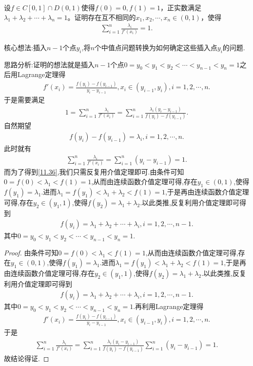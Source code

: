 \documentclass[../../main.tex]{subfiles}%
\begin{document}
\begin{example}
设\(f\in C[0,1]\cap D(0,1)\)使得\(f(0)=0,f(1)=1\)，正实数满足\(\lambda_1 + \lambda_2 + \cdots + \lambda_n = 1\)。证明存在互不相同的\(x_1,x_2,\cdots,x_n\in(0,1)\)，使得
\begin{align*}
\sum_{i = 1}^{n}\frac{\lambda_i}{f'(x_i)} = 1.
\end{align*} 
\end{example}
\begin{note}
核心想法:插入$n-1$个点$y_i$,将$n$个中值点问题转换为如何确定这些插入点$y_i$的问题.
\end{note}
\begin{remark}
思路分析:证明的想法就是插入\(n - 1\)个点\(0 = y_0 < y_1 < y_2 < \cdots < y_{n - 1} < y_n = 1\)之后用Lagrange定理得
\begin{align*}
f'(x_i)=\frac{f(y_i)-f(y_{i - 1})}{y_i - y_{i - 1}},x_i\in(y_{i - 1},y_i),i = 1,2,\cdots,n.
\end{align*}
于是需要满足
\begin{align*}
1=\sum_{i = 1}^{n}\frac{\lambda_i}{f'(x_i)}=\sum_{i = 1}^{n}\frac{\lambda_i(y_i - y_{i - 1})}{f(y_i)-f(y_{i - 1})}.
\end{align*}
自然期望
\begin{align}
f(y_i)-f(y_{i - 1})=\lambda_i,i = 1,2,\cdots,n.\label{11.36}
\end{align}
此时就有
\begin{align*}
\sum_{i = 1}^{n}\frac{\lambda_i}{f'(x_i)}=\sum_{i = 1}^{n}(y_i - y_{i - 1}) = 1.
\end{align*}
而为了得到\eqref{11.36},我们只需反复用介值定理即可.由条件可知$0=f(0)<\lambda_1<f(1)=1$,从而由连续函数介值定理可得,存在$y_1\in (0,1)$,使得$f(y_1)=\lambda_1$.进而$\lambda_1=f(y_1)<\lambda_1+\lambda_2<f(1)=1$,于是再由连续函数介值定理可得,存在$y_2\in (y_1,1)$,使得$f(y_2)=\lambda_1+\lambda_2$.以此类推,反复利用介值定理即可得到
\begin{align*}
f(y_i)=\lambda_1+\lambda_2+\cdots+\lambda_i,i = 1,2,\cdots,n - 1.
\end{align*}
其中\(0 = y_0 < y_1 < y_2 < \cdots < y_{n - 1} < y_n = 1\).
\end{remark}
\begin{proof}
由条件可知$0=f(0)<\lambda_1<f(1)=1$,从而由连续函数介值定理可得,存在$y_1\in (0,1)$,使得$f(y_1)=\lambda_1$.进而$\lambda_1=f(y_1)<\lambda_1+\lambda_2<f(1)=1$,于是再由连续函数介值定理可得,存在$y_2\in (y_1,1)$,使得$f(y_2)=\lambda_1+\lambda_2$.以此类推,反复利用介值定理即可得到
\begin{align*}
f(y_i)=\lambda_1+\lambda_2+\cdots+\lambda_i,i = 1,2,\cdots,n - 1.
\end{align*}
其中\(0 = y_0 < y_1 < y_2 < \cdots < y_{n - 1} < y_n = 1\).再利用Lagrange定理得
\begin{align*}
f'(x_i)=\frac{f(y_i)-f(y_{i - 1})}{y_i - y_{i - 1}},x_i\in(y_{i - 1},y_i),i = 1,2,\cdots,n.
\end{align*}
于是
\begin{align*}
\sum_{i = 1}^{n}\frac{\lambda_i}{f'(x_i)}=\sum_{i = 1}^{n}\frac{\lambda_i(y_i - y_{i - 1})}{f(y_i)-f(y_{i - 1})}\sum_{i = 1}^{n}(y_i - y_{i - 1}) = 1.
\end{align*}
故结论得证.
\end{proof}
\end{document}
